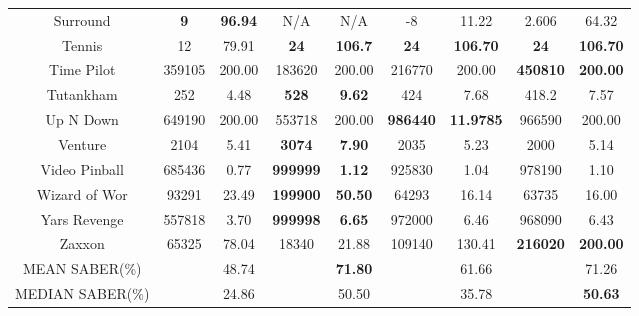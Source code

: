 \documentclass[nohyperref]{article}
\def\GDIHmeanSABER{71.26}
\def\GDIHmedianSABER{50.63}
\def\GDIImeanSABER{61.66}
\def\GDIImedianSABER{35.78}
\def\mueslimeanSABER{48.74}
\def\mueslimedianSABER{24.86}
\def\goexploremeanSABER{71.80}
\def\goexploremedianSABER{50.50}
\newcommand{\best}[1]{\textbf{#1}}
\theoremstyle{plain}
\begin{document}
\begin{table}[!hb]
\begin{center}
\begin{tabular}{| c | c c |  c c| c c| c c|}
 Surround       &\textbf{9}    &\textbf{96.94}      &N/A                    &N/A                            & -8         &11.22                 &2.606           &64.32\\
 Tennis         &12            &79.91               &\best{24}              &\best{106.7}                   & \best{24}         &\best{106.70   }&\textbf{24}           &\textbf{106.70}            \\
 Time Pilot     &359105 &200.00   &183620                &200.00                         & 216770     & 200.00               &\textbf{450810}          &\textbf{200.00}\\
 Tutankham      &252           &4.48                &\textbf{528}           &\textbf{9.62}                  & 424               &7.68           &418.2           &7.57\\
 Up N Down      &649190        &200.00              &553718                &200.00                         & \best{986440}     &\best{11.9785}  &966590        &200.00         \\
 Venture        &2104          &5.41                &\textbf{3074}         &\textbf{7.90}                  & 2035              &5.23            &2000            &5.14\\
 Video Pinball  &685436        &0.77                &\textbf{999999}       &\textbf{1.12}                  & 925830            &1.04            &978190          &1.10\\
 Wizard of Wor  &93291         &23.49               &\textbf{199900}       &\textbf{50.50}                 & 64293             &16.14           &63735           &16.00\\
 Yars Revenge   &557818        &3.70                &\textbf{999998}       &\textbf{6.65}                  & 972000            &6.46            &968090          &6.43\\
 Zaxxon         &65325         &78.04               &18340                 &21.88                          & 109140         &130.41   &\textbf{216020} &\textbf{200.00}        \\
\hline    
MEAN SABER(\%)  &              & \mueslimeanSABER              &                       & \textbf{\goexploremeanSABER}                &                   & \GDIImeanSABER &      &\GDIHmeanSABER\\
\hline
MEDIAN SABER(\%)&              &  \mueslimedianSABER             &                       &\goexploremedianSABER                 &                   & \GDIImedianSABER &      & \textbf{\GDIHmedianSABER}  \\
\hline
\end{tabular}
\end{center}
\end{table}
\end{document}
